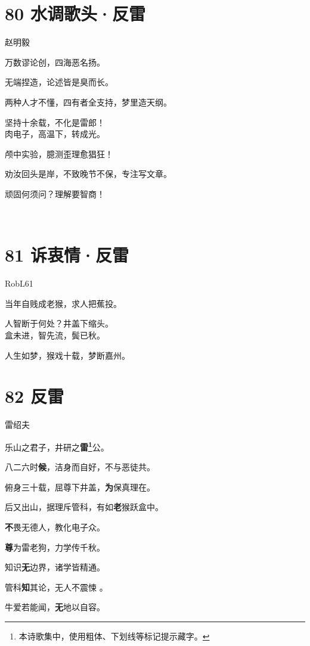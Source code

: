 \documentclass[UTF8,12pt,oneside]{ctexbook}
\def\pau#1{\begin{center} {#1} \end{center}} %
\def\poem#1#2{\section{#1}\pau{#2}} %
\def\lid{\setlength\parindent{5em}}
\def\lidlid{\setlength\parindent{8em}}
\def\lidend{\setlength\parindent{2em}}
\begin{document}
    \newpage
    
    \poem{80 水调歌头·反雷}{赵明毅}
    
     \lid
       万数谬论创，四海恶名扬。
       
       无端捏造，论述皆是臭而长。
       
       两种人才不懂，四有者全支持，梦里造天纲。
       
       坚持十余载，不化是雷郎！ 
       ~\\

       肉电子，高温下，转成光。
       
       颅中实验，臆测歪理愈猖狂！
       
       劝汝回头是岸，不致晚节不保，专注写文章。
       
       顽固何须问？理解要智商！
       
    \lidend
      
      ~\\
      
    \poem{81 诉衷情·反雷}{RobL61}
    \lidlid
    
        当年自贱成老猴，求人把蕉投。
        
        人智断于何处？井盖下缩头。 
        ~\\
        
        盒未进，智先流，鬓已秋。
        
        人生如梦，猴戏十载，梦断嘉州。
    
    \lidend
        
    \newpage

    \poem{82 反雷}{雷绍夫}
     \setlength\parindent{6em}
     
         乐山之君子，井研之\textbf{雷\footnote{本诗歌集中，使用粗体、下划线等标记提示藏字。}}公。
         
         八二六时\textbf{候}，洁身而自好，不与恶徒共。
         
         俯身三十载，屈尊下井盖，\textbf{为}保真理在。 
         
         后又出山，据理斥管科，有如\textbf{老}猴跃盒中。
         
         \textbf{不}畏无德人，教化电子众。
         
         \textbf{尊}为雷老狗，力学传千秋。
         
         知识\textbf{无}边界，诸学皆精通。
         
         管科\textbf{知}其论，无人不震悚 。
         
         牛爱若能闻，\textbf{无}地以自容。
         
\end{document}
